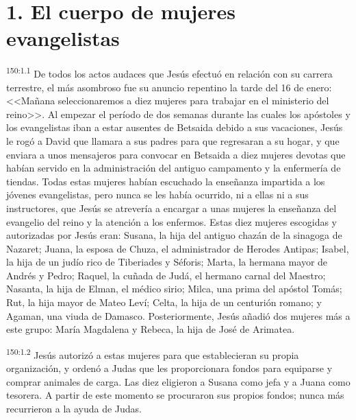 \section*{1. El cuerpo de mujeres evangelistas}
\par 
\textsuperscript{150:1.1} De todos los actos audaces que Jesús efectuó en relación con su carrera terrestre, el más asombroso fue su anuncio repentino la tarde del 16 de enero: <<Mañana seleccionaremos a diez mujeres para trabajar en el ministerio del reino>>. Al empezar el período de dos semanas durante las cuales los apóstoles y los evangelistas iban a estar ausentes de Betsaida debido a sus vacaciones, Jesús le rogó a David que llamara a sus padres para que regresaran a su hogar, y que enviara a unos mensajeros para convocar en Betsaida a diez mujeres devotas que habían servido en la administración del antiguo campamento y la enfermería de tiendas. Todas estas mujeres habían escuchado la enseñanza impartida a los jóvenes evangelistas, pero nunca se les había ocurrido, ni a ellas ni a sus instructores, que Jesús se atrevería a encargar a unas mujeres la enseñanza del evangelio del reino y la atención a los enfermos. Estas diez mujeres escogidas y autorizadas por Jesús eran: Susana, la hija del antiguo chazán de la sinagoga de Nazaret; Juana, la esposa de Chuza, el administrador de Herodes Antipas; Isabel, la hija de un judío rico de Tiberiades y Séforis; Marta, la hermana mayor de Andrés y Pedro; Raquel, la cuñada de Judá, el hermano carnal del Maestro; Nasanta, la hija de Elman, el médico sirio; Milca, una prima del apóstol Tomás; Rut, la hija mayor de Mateo Leví; Celta, la hija de un centurión romano; y Agaman, una viuda de Damasco. Posteriormente, Jesús añadió dos mujeres más a este grupo: María Magdalena y Rebeca, la hija de José de Arimatea.

\par 
\textsuperscript{150:1.2} Jesús autorizó a estas mujeres para que establecieran su propia organización, y ordenó a Judas que les proporcionara fondos para equiparse y comprar animales de carga. Las diez eligieron a Susana como jefa y a Juana como tesorera. A partir de este momento se procuraron sus propios fondos; nunca más recurrieron a la ayuda de Judas.


